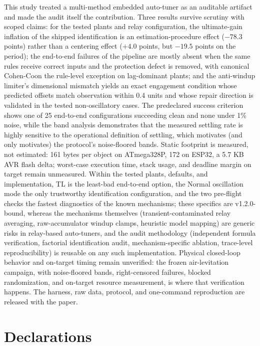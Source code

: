\documentclass[10pt,twocolumn]{article}
\begin{document}
This study treated a multi-method embedded auto-tuner as an auditable artifact and made the audit itself the contribution. Three results survive scrutiny with scoped claims: for the tested plants and relay configuration, the ultimate-gain inflation of the shipped identification is an estimation-procedure effect ($-78.3$ points) rather than a centering effect ($+4.0$ points, but $-19.5$ points on the period); the end-to-end failures of the pipeline are mostly absent when the same rules receive correct inputs and the protection defect is removed, with canonical Cohen-Coon the rule-level exception on lag-dominant plants; and the anti-windup limiter's dimensional mismatch yields an exact engagement condition whose predicted offsets match observation within 0.4 units and whose repair direction is validated in the tested non-oscillatory cases. The predeclared success criterion shows one of 25 end-to-end configurations succeeding clean and none under 1\% noise, while the band analysis demonstrates that the measured settling rate is highly sensitive to the operational definition of settling, which motivates (and only motivates) the protocol's noise-floored bands. Static footprint is measured, not estimated: 161 bytes per object on ATmega328P, 172 on ESP32, a 5.7 KB AVR flash delta; worst-case execution time, stack usage, and deadline margin on target remain unmeasured. Within the tested plants, defaults, and implementation, TL is the least-bad end-to-end option, the Normal oscillation mode the only trustworthy identification configuration, and the two pre-flight checks the fastest diagnostics of the known mechanisms; these specifics are v1.2.0-bound, whereas the mechanisms themselves (transient-contaminated relay averaging, raw-accumulator windup clamps, heuristic model mapping) are generic risks in relay-based auto-tuners, and the audit methodology (independent formula verification, factorial identification audit, mechanism-specific ablation, trace-level reproducibility) is reusable on any such implementation. Physical closed-loop behavior and on-target timing remain unverified: the frozen air-levitation campaign, with noise-floored bands, right-censored failures, blocked randomization, and on-target resource measurement, is where that verification happens. The harness, raw data, protocol, and one-command reproduction are released with the paper.

\section*{Declarations}
\end{document}

